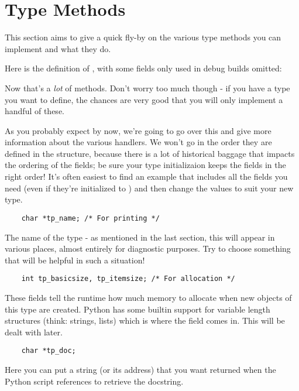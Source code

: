 \section{Type Methods
         \label{dnt-type-methods}}

This section aims to give a quick fly-by on the various type methods
you can implement and what they do.

Here is the definition of , with some fields only
used in debug builds omitted:



Now that's a \emph{lot} of methods.  Don't worry too much though - if
you have a type you want to define, the chances are very good that you
will only implement a handful of these.

As you probably expect by now, we're going to go over this and give
more information about the various handlers.  We won't go in the order
they are defined in the structure, because there is a lot of
historical baggage that impacts the ordering of the fields; be sure
your type initializaion keeps the fields in the right order!  It's
often easiest to find an example that includes all the fields you need
(even if they're initialized to ) and then change the values
to suit your new type.

\begin{verbatim}
    char *tp_name; /* For printing */
\end{verbatim}

The name of the type - as mentioned in the last section, this will
appear in various places, almost entirely for diagnostic purposes.
Try to choose something that will be helpful in such a situation!

\begin{verbatim}
    int tp_basicsize, tp_itemsize; /* For allocation */
\end{verbatim}

These fields tell the runtime how much memory to allocate when new
objects of this type are created.  Python has some builtin support
for variable length structures (think: strings, lists) which is where
the  field comes in.  This will be dealt with
later.

\begin{verbatim}
    char *tp_doc;
\end{verbatim}

Here you can put a string (or its address) that you want returned when
the Python script references  to retrieve the
docstring.
   
